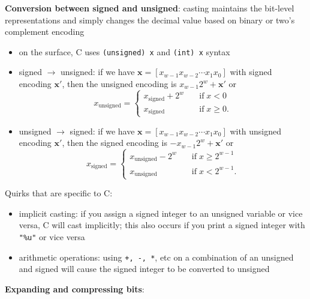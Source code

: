 \documentclass{article}
\theoremstyle{definition} %
\begin{document}
\begin{flushleft}
\textbf{Conversion between signed and unsigned}: casting maintains the bit-level representations and simply changes the decimal value based on binary or two's complement encoding

\begin{itemize}
    \item on the surface, C uses \texttt{(unsigned) x} and \texttt{(int) x} syntax
    \item signed $\to$ unsigned: if we have $\textbf{x} = [x_{w-1} x_{w-2} \cdots x_{1} x_0]$ with signed encoding $\textbf{x}'$, then the unsigned encoding is $x_{w-1}2^w + \textbf{x}'$ or
    \[
    x_{\text{unsigned}} = \begin{cases}
    x_{\text{signed}} + 2^w \quad &\text{if} \; x < 0 \\
    x_{\text{signed}} \quad &\text{if} \; x \geq 0.
    \end{cases}
    \]
    \item unsigned $\to$ signed: if we have $\textbf{x} = [x_{w-1} x_{w-2} \cdots x_{1} x_0]$ with unsigned encoding $\textbf{x}'$, then the signed encoding is $-x_{w-1} 2^w + \textbf{x}'$ or
    \[
    x_{\text{signed}} = \begin{cases}
    x_{\text{unsigned}} - 2^w \quad &\text{if} \; x \geq 2^{w-1} \\
    x_{\text{unsigned}} \quad &\text{if} \; x < 2^{w-1}.
    \end{cases}
    \]
\end{itemize}

Quirks that are specific to C:

\begin{itemize}
    \item implicit casting: if you assign a signed integer to an unsigned variable or vice versa, C will cast implicitly; this also occurs if you print a signed integer with \texttt{"\%u"} or vice versa
    \item arithmetic operations: using \texttt{+, -, *}, etc on a combination of an unsigned and signed will cause the signed integer to be converted to unsigned
\end{itemize}

\textbf{Expanding and compressing bits}:


\end{flushleft}
\end{document}
